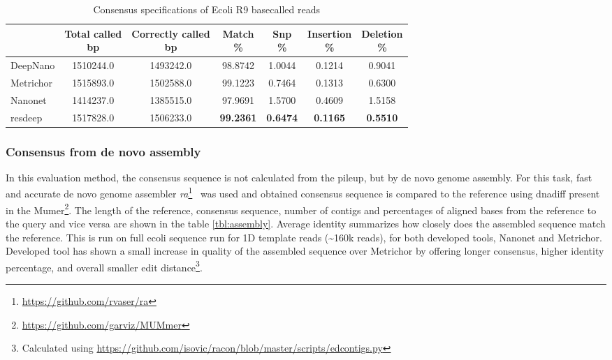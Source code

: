 \documentclass[runningheads,a4paper]{llncs}
\begin{document}
\begin{table}[]
	\caption{Consensus specifications of Ecoli R9 basecalled reads}
	\label{tbl:spec_ecoli}
	\centering
	\begin{tabular}{lcccccc}
		\toprule
		{} &  \thead{Total called\\\lbrack bp\rbrack} &  \thead{Correctly called\\\lbrack bp\rbrack} &  \thead{Match\\\%} &  \thead{Snp\\\%} &  \thead{Insertion\\\%} &  \thead{Deletion\\\%} \\
		\midrule
		DeepNano  &                  1510244.0 &                      1493242.0 &          98.8742 &         1.0044 &               0.1214 &              0.9041 \\
		Metrichor &                  1515893.0 &                      1502588.0 &          99.1223 &         0.7464 &               0.1313 &              0.6300 \\
		Nanonet   &                  1414237.0 &                      1385515.0 &          97.9691 &         1.5700 &               0.4609 &              1.5158 \\
		resdeep   &                  1517828.0 &                      1506233.0 &          \textbf{99.2361} &         \textbf{0.6474} &               \textbf{0.1165} &             \textbf{ 0.5510 }\\
		\bottomrule
	\end{tabular}
\end{table}


\subsubsection{Consensus from de novo assembly}

In this evaluation method, the consensus sequence is not calculated from the pileup, but by de novo genome assembly. For this task, fast and accurate de novo genome assembler \emph{ra}\footnote{\url{https://github.com/rvaser/ra}}~\cite{vaser} was used and obtained consensus sequence is compared to the reference using dnadiff present in the Mumer\footnote{\url{https://github.com/garviz/MUMmer}}.
The length of the reference, consensus sequence, number of contigs and percentages of aligned bases from the reference to the query and vice versa are shown in the table \ref{tbl:assembly}. Average identity summarizes how closely does the assembled sequence match the reference. This is run on full ecoli sequence run for 1D template reads (\textasciitilde 160k reads), for both developed tools, Nanonet and Metrichor. Developed tool has shown a small increase in quality of the assembled sequence over Metrichor by offering longer consensus, higher identity percentage, and overall smaller edit distance\footnote{Calculated using \url{https://github.com/isovic/racon/blob/master/scripts/edcontigs.py}}.
\end{document}
